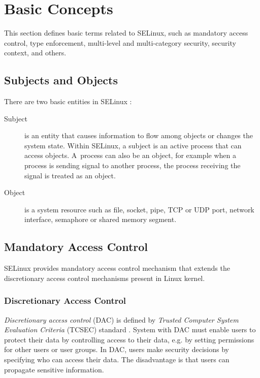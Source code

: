 \section{Basic Concepts}

This section defines basic terms related to SELinux, such as mandatory access
control, type enforcement, multi-level and multi-category security, security
context, and others.

\subsection{Subjects and Objects}
There are two basic entities in SELinux \cite[p.~29]{tsn}:
\begin{description}
    \item [Subject] is an entity that causes information to flow among objects
        or changes the system state. Within SELinux, a subject is an active
        process that can access objects. A~process can also be an object, for
        example when a process is sending signal to another process, the process
        receiving the signal is treated as an object.
    \item [Object] is a system resource such as file, socket, pipe, TCP or UDP
        port, network interface, semaphore or shared memory segment.
\end{description}

\subsection{Mandatory Access Control}

SELinux provides mandatory access control mechanism that extends the
discretionary access control mechanisms present in Linux kernel.

\subsubsection{Discretionary Access Control}
\emph{Discretionary access control} (DAC) is defined by \emph{Trusted Computer
System Evaluation Criteria} (TCSEC) standard \cite{orangebook}. System with DAC
must enable users to protect their data by controlling access to their data,
e.g. by setting permissions for other users or user groups. In DAC, users make
security decisions by specifying who can access their data. The disadvantage is
that users can propagate sensitive information.

